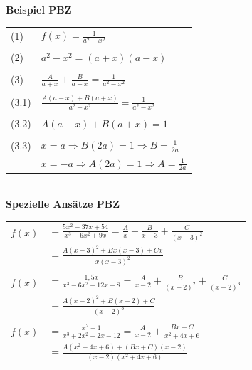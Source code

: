 			\textbf{Beispiel PBZ} \\
				\begin{tabular}{ll}
					(1) & $f(x) = \frac{1}{a^2 - x^2}$ \\
					\\
					(2) & $a^2 - x^2 = (a+x)(a-x)$ \\
					\\
					(3) & $\frac{A}{a+x} + \frac{B}{a-x} = \frac{1}{a^2 - x^2}$\\
					\\
					(3.1) & $\frac{A(a-x) + B(a+x)}{a^2 - x^2} = \frac{1}{a^2 - x^2}$ \\
					\\
					(3.2) &$ A(a-x) + B(a+x) = 1$ \\
					\\
					(3.3) & $x = a \Rightarrow B(2a) = 1 \Rightarrow B = \frac{1}{2a} $ \\			
					& $x = -a \Rightarrow A(2a) = 1 \Rightarrow A = \frac{1}{2a} $ \\
				\end{tabular}
			\\
			\textbf{Spezielle Ansätze PBZ} \\
				\begin{tabular}{ll}
					$f(x)$ & $=\frac{5x^2-37x+54}{x^3-6x^2+9x} =  \frac{A}{x}+\frac{B}{x-3}+\frac{C}{(x-3)^2}$ \\ 
					       & $=\frac{A(x-3)^2+Bx(x-3)+Cx}{x(x-3)^2}$ \\
					\\
					$f(x)$ & $=\frac{1,5x}{x^3-6x^2+12x-8}=\frac{A}{x-2}+\frac{B}{(x-2)^2}+\frac{C}{(x-2)^3}$ \\
					       & $=\frac{A(x-2)^2+B(x-2)+C}{(x-2)^3}$ \\
					\\
					$f(x)$ & $=\frac{x^2-1}{x^3+2x^2-2x-12}=\frac{A}{x-2}+\frac{Bx+C}{x^2+4x+6}$ \\
					       & $=\frac{A(x^2+4x+6)+(Bx+C)(x-2)}{(x-2)(x^2+4x+6)}$ \\
				\end{tabular}
		
